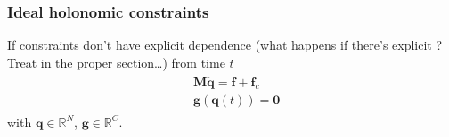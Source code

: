 \documentclass[letterpaper,10pt,english]{jupyterBook}
\begin{document}
\subsubsection{Ideal holonomic constraints}
\label{\detokenize{ch/lagrange-constraints:classical-mechanics-lagrange-constraints-ideal-holonomic}}\label{\detokenize{ch/lagrange-constraints:ideal-holonomic-constraints}}
\sphinxAtStartPar
If constraints don’t have explicit dependence (what happens if there’s explicit {\hyperref[\detokenize{ch/lagrange-t-explicit:classical-mechanics-lagrange-time-dependent}]{}}? Treat in the proper section…) from time \(t\)
\begin{equation*}
\begin{split}\begin{aligned}
  & \mathbf{M} \ddot{\mathbf{q}} = \mathbf{f} + \mathbf{f}_c \\
  & \mathbf{g}(\mathbf{q}(t)) = \mathbf{0}
\end{aligned}\end{split}
\end{equation*}
\sphinxAtStartPar
with \(\mathbf{q} \in \mathbb{R}^N\), \(\mathbf{g} \in \mathbb{R}^C\).
\end{document}
